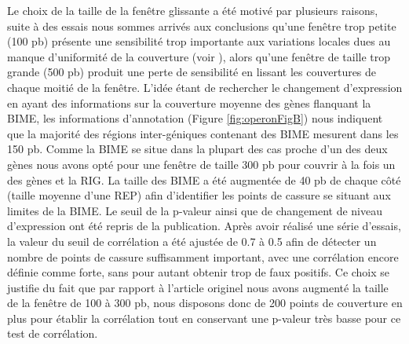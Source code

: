 \documentclass[12pt,a4paper]{report}
\begin{document}
\begin{onehalfspace}
Le choix de la taille de la fenêtre glissante a été motivé par plusieurs raisons, suite à des essais nous sommes arrivés aux conclusions qu'une fenêtre trop petite (100 pb) présente une sensibilité trop importante aux variations locales dues au manque d'uniformité de la couverture (voir ), alors qu'une fenêtre de taille trop grande (500 pb) produit une perte de sensibilité en lissant les couvertures de chaque moitié de la fenêtre. L'idée étant de rechercher le changement d'expression en ayant des informations sur la couverture moyenne des gènes flanquant la BIME, les informations d'annotation (Figure \autoref{fig:operonFigB}) nous indiquent que la majorité des régions inter-géniques contenant des BIME mesurent dans les 150 pb. Comme la BIME se situe dans la plupart des cas proche d'un des deux gènes nous avons opté pour une fenêtre de taille 300 pb pour couvrir à la fois un des gènes et la RIG. La taille des BIME a été augmentée de 40 pb de chaque côté (taille moyenne d'une REP) afin d'identifier les points de cassure se situant aux limites de la BIME. Le seuil de la p-valeur ainsi que de changement de niveau d'expression ont été repris de la publication. Après avoir réalisé une série d'essais, la valeur du seuil de corrélation a été ajustée de 0.7 à 0.5 afin de détecter un nombre de points de cassure suffisamment important, avec une corrélation encore définie comme forte, sans pour autant obtenir trop de faux positifs. Ce choix se justifie du fait que par rapport à l'article originel nous avons augmenté la taille de la fenêtre de 100 à 300 pb, nous disposons donc de 200 points de couverture en plus pour établir la corrélation tout en conservant une p-valeur très basse pour ce test de corrélation. 


\end{onehalfspace}
\end{document}
